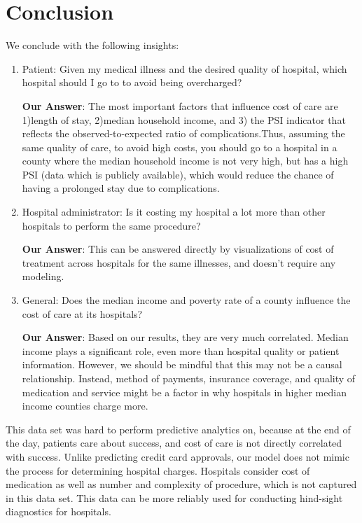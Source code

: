 \documentclass[letterpaper,11pt]{article}
\begin{document}
\section*{Conclusion}
We conclude with the following insights:
\begin{enumerate}
  \item Patient: Given my medical illness and the desired quality of hospital, which hospital should I go to to avoid being overcharged? 
  
  \textbf{Our Answer}: The most important factors that influence cost of care are 1)length of stay, 2)median household income, and 3) the PSI indicator that reflects the observed-to-expected ratio of complications.Thus, assuming the same quality of care, to avoid high costs, you should go to a hospital in a county where the median household income is not very high, but has a high PSI (data which is publicly available), which would reduce the chance of having a prolonged stay due to complications.
  
  \item Hospital administrator: Is it costing my hospital a lot more than other hospitals to perform the same procedure?
  
    \textbf{Our Answer}: This can be answered directly by visualizations of cost of treatment across hospitals for the same illnesses, and doesn't require any modeling.
  \item General: Does the median income and poverty rate of a county influence the cost of care at its hospitals? 
  
    \textbf{Our Answer}: Based on our results, they are very much correlated. Median income plays a significant role, even more than hospital quality or patient information. However, we should be mindful that this may not be a causal relationship. Instead, method of payments, insurance coverage, and quality of medication and service might be a factor in why hospitals in higher median income counties charge more. 
\end{enumerate}

This data set was hard to perform predictive analytics on, because at the end of the day, patients care about success, and cost of care is not directly correlated with success. Unlike predicting credit card approvals, our model does not mimic the process for determining hospital charges. Hospitals consider cost of medication as well as number and complexity of procedure, which is not captured in this data set. This data can be more reliably used for conducting hind-sight diagnostics for hospitals. 
\end{document}
